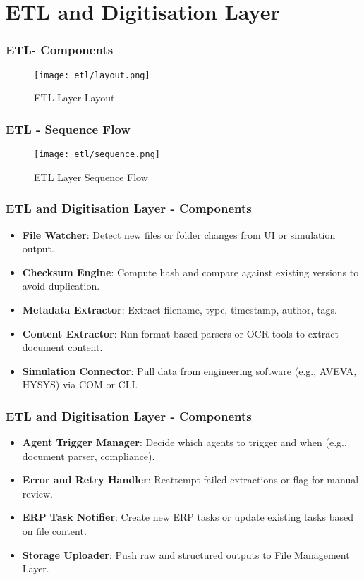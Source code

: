 \section{ETL and Digitisation Layer}

\begin{frame}
    \frametitle{ETL- Components}
    \begin{figure}
        \centering
        \texttt{[image: etl/layout.png]} %
        \caption{ETL Layer Layout}
    \end{figure}
\end{frame}

\begin{frame}
    \frametitle{ETL - Sequence Flow}
    \begin{figure}
        \centering
        \texttt{[image: etl/sequence.png]} %
        \caption{ETL Layer Sequence Flow}
    \end{figure}
\end{frame}



\begin{frame}
    \frametitle{ETL and Digitisation Layer - Components}
    \begin{itemize}
        \item \textbf{File Watcher}: Detect new files or folder changes from UI or simulation output.
        \item \textbf{Checksum Engine}: Compute hash and compare against existing versions to avoid duplication.
        \item \textbf{Metadata Extractor}: Extract filename, type, timestamp, author, tags.
        \item \textbf{Content Extractor}: Run format-based parsers or OCR tools to extract document content.
        \item \textbf{Simulation Connector}: Pull data from engineering software (e.g., AVEVA, HYSYS) via COM or CLI.
    \end{itemize}
\end{frame}

\begin{frame}
    \frametitle{ETL and Digitisation Layer - Components}
    \begin{itemize}
        \item \textbf{Agent Trigger Manager}: Decide which agents to trigger and when (e.g., document parser, compliance).
        \item \textbf{Error and Retry Handler}: Reattempt failed extractions or flag for manual review.
        \item \textbf{ERP Task Notifier}: Create new ERP tasks or update existing tasks based on file content.
        \item \textbf{Storage Uploader}: Push raw and structured outputs to File Management Layer.
    \end{itemize}
\end{frame}

